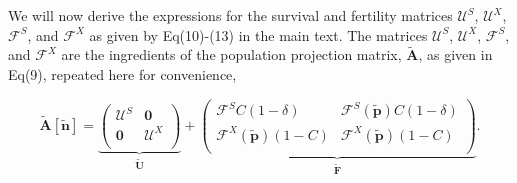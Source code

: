 \documentclass[11pt]{article}
\def\mbf#1{\mathbf{#1}}
\def\mcal#1{\mathcal{#1}}
\begin{document}
We will now derive the expressions for the survival and fertility matrices $\mcal{U}^S$, $\mcal{U}^X$, $\mcal{F}^S$, and $\mcal{F}^X$ as given by Eq(10)-(13) in the main text. The matrices $\mcal{U}^S$, $\mcal{U}^X$, $\mcal{F}^S$, and $\mcal{F}^X$ are the ingredients of the population projection matrix, $\tilde{\mbf{A}}$, as given in Eq(9), repeated here for convenience, 
\begin{linenomath*}
\begin{equation} \label{eq:Atilde_appendix}
	\tilde{\mbf{A}}[\tilde{\mbf{n}}] = 
			\underbrace{\left(
			\begin{array}{c|c}
				\mcal{U}^S & \mbf{0} \\ \hline
				\mbf{0} & \mcal{U}^X \\
			\end{array} \right)}_{\tilde{\mbf{U}}} + 
			\underbrace{\left(
			\begin{array}{c|c}
				\mcal{F}^S C(1 - \delta) & \mcal{F}^S(\tilde{\mbf{p}}) C(1 - \delta) \\ \hline
				\mcal{F}^X(\tilde{\mbf{p}}) (1 - C) & \mcal{F}^X(\tilde{\mbf{p}}) (1 - C)\\
			\end{array} \right)}_{\tilde{\mbf{F}}}.
\end{equation}
\end{linenomath*}
\end{document}
